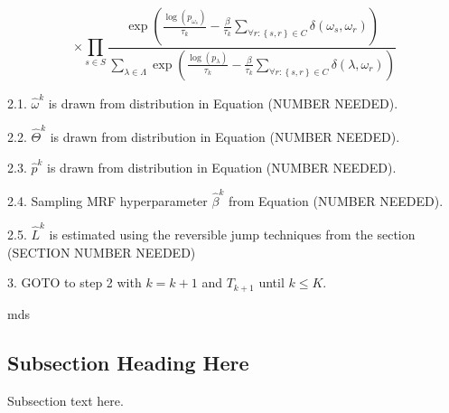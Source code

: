 \documentclass[journal]{IEEEtran}
\begin{document}
{\begin{equation}
{\times
\prod\limits_{s\in S}\frac
{\exp\left(\frac{\log\left(p_{\omega_{s}}\right)}{\tau_{k}}
-\frac{\beta}{\tau_{k}}\sum\limits_{\forall r : \left\{s,r\right\}\in C}\delta\left(\omega_{s},\omega_{r}\right)\right)}
{
\sum\limits_{\lambda\in\Lambda}
\exp\left(\frac{\log\left(p_{\lambda}\right)}{\tau_{k}}
-\frac{\beta}{\tau_{k}}\sum\limits_{\forall r : \left\{s,r\right\}\in C}\delta\left(\lambda,\omega_{r}\right)\right)}
}
\end{equation}

2.1. $\widehat{\omega}^{k}$ is drawn from distribution in Equation (NUMBER NEEDED).

2.2. $\widehat{\Theta}^{k}$ is drawn from distribution in Equation (NUMBER NEEDED).

2.3. $\widehat{p}^{k}$ is drawn from distribution in Equation (NUMBER NEEDED).

2.4. Sampling MRF hyperparameter $\widehat{\beta}^{k}$ from Equation (NUMBER NEEDED).

2.5. $\widehat{L}^{k}$ is estimated using the reversible jump techniques from the section (SECTION NUMBER NEEDED)

3. GOTO to step 2 with $k=k+1$ and $T_{k+1}$ until $k\leq K$.

% 
% 
% 
% 

\hfill mds
 
\hfill \date{\today}

\subsection{Subsection Heading Here}
Subsection text here.


}
\end{document}
